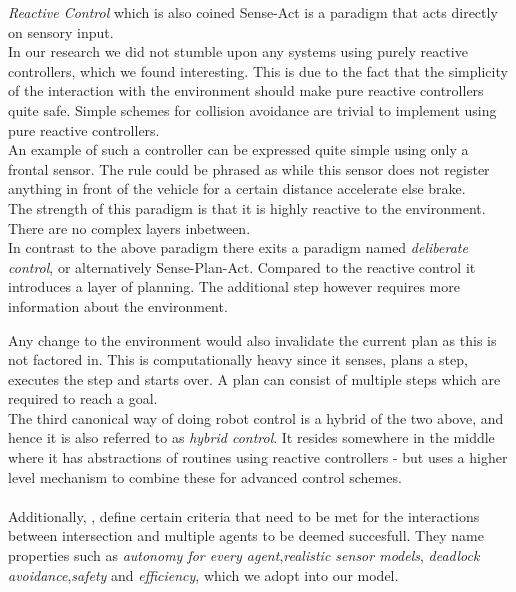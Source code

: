 \textit{Reactive Control} which is also coined Sense-Act is a paradigm that acts directly on sensory input.\\
In our research we did not stumble upon any systems using purely reactive controllers, which we found interesting. This is due to the fact that the simplicity of the interaction with the environment should make pure reactive controllers quite safe.
Simple schemes for collision avoidance are trivial to implement using pure reactive controllers.\\
An example of such a controller can be expressed quite simple using only a frontal sensor. The rule could be phrased as while this sensor does not register anything in front of the vehicle for a certain distance accelerate else brake.\\
The strength of this paradigm is that it is highly reactive to the environment. There are no complex layers inbetween.\\

In contrast to the above paradigm there exits a paradigm named \textit{deliberate control}, or alternatively Sense-Plan-Act.
Compared to the reactive control it introduces a layer of planning.
The additional step however requires more information about the environment.

Any change to the environment would also invalidate the current plan as this is not factored in.
This is computationally heavy since it senses, plans a step, executes the step and starts over.
A plan can consist of multiple steps which are required to reach a goal.\\

The third canonical way of doing robot control is a hybrid of the two above, and hence it is also referred to as \textit{hybrid control}.
It resides somewhere in the middle where it has abstractions of routines using reactive controllers - but uses a higher level mechanism to combine these for advanced control schemes.\\


\\

Additionally, \citeauthor{texas}, define certain criteria that need to be met for the interactions between intersection and multiple agents to be deemed succesfull.
They name properties such as \textit{autonomy for every agent},\textit{realistic sensor models}, \textit{deadlock avoidance},\textit{safety} and \textit{efficiency}, which we adopt into our model.

